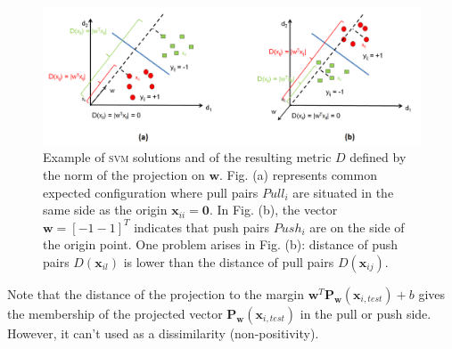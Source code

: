 \begin{figure}[h!]
	\centering
	\includegraphics[width=1\linewidth]{images/Dissimilarity_def_norm_scalar_product}
	\caption[Example of \textsc{svm} solutions and of the resulting metric $D$ defined by the norm of the projection on $\textbf{w}$. ]{Example of \textsc{svm} solutions and of the resulting metric $D$ defined by the norm of the projection on $\textbf{w}$. Fig. (a) represents common expected configuration where pull pairs $Pull_i$ are situated in the same side as the origin $\textbf{x}_{ii}=\textbf{0}$. In Fig. (b), the vector $\textbf{w}=[-1 -1]^T$ indicates that push pairs $Push_i$ are on the side of the origin point. One problem arises in Fig. (b): distance of push pairs $D(\textbf{x}_{il})$ is lower than the distance of pull pairs $D(\textbf{x}_{ij})$.}
	\label{fig:Dissimilarity_def_norm_scalar_product}
\end{figure}

Note that the distance of the projection to the margin $\textbf{w}^T \textbf{P}_\textbf{w}(\textbf{x}_{i,test}) + b$ gives the membership of the projected vector $\textbf{P}_\textbf{w}(\textbf{x}_{i,test})$ in the pull or push side. However, it can't used as a dissimilarity (non-positivity). 

